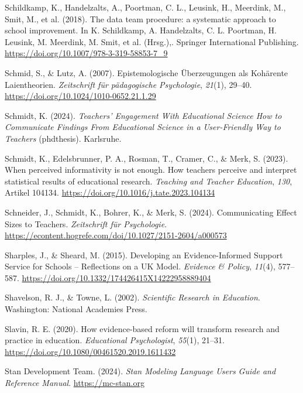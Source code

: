 \documentclass[
  jou,
  floatsintext,
  longtable,
  nolmodern,
  notxfonts,
  notimes,
  colorlinks=true,linkcolor=blue,citecolor=blue,urlcolor=blue]{apa7}
\newlength{\cslhangindent}
\newenvironment{CSLReferences}[2] %
 {\begin{list}{}{%
  \setlength{\itemindent}{0pt}
  \setlength{\leftmargin}{0pt}
  \setlength{\parsep}{0pt}
  \ifodd #1
   \setlength{\leftmargin}{\cslhangindent}
   \setlength{\itemindent}{-1\cslhangindent}
  \fi
  \setlength{\itemsep}{#2\baselineskip}}}
 {\end{list}}
\begin{document}
\begin{CSLReferences}{1}{0}
Schildkamp, K., Handelzalts, A., Poortman, C. L., Leusink, H., Meerdink,
M., Smit, M., et al. (2018). The data team{\texttrademark} procedure: a
systematic approach to school improvement. In K. Schildkamp, A.
Handelzalts, C. L. Poortman, H. Leusink, M. Meerdink, M. Smit, et al.
(Hrsg.),. Springer International Publishing.
\url{https://doi.org/10.1007/978-3-319-58853-7_9}

Schmid, S., \& Lutz, A. (2007). Epistemologische Überzeugungen als
Kohärente Laientheorien. \emph{Zeitschrift für pädagogische
Psychologie}, \emph{21}(1), 29--40.
\url{https://doi.org/10.1024/1010-0652.21.1.29}

Schmidt, K. (2024). \emph{Teachers{'} Engagement With Educational
Science How to Communicate Findings From Educational Science in a
User-Friendly Way to Teachers} (phdthesis). Karlsruhe.

Schmidt, K., Edelsbrunner, P. A., Rosman, T., Cramer, C., \& Merk, S.
(2023). When perceived informativity is not enough. How teachers
perceive and interpret statistical results of educational research.
\emph{Teaching and Teacher Education}, \emph{130}, Artikel 104134.
\url{https://doi.org/10.1016/j.tate.2023.104134}

Schneider, J., Schmidt, K., Bohrer, K., \& Merk, S. (2024).
Communicating Effect Sizes to Teachers. \emph{Zeitschrift für
Psychologie}.
\url{https://econtent.hogrefe.com/doi/10.1027/2151-2604/a000573}

Sharples, J., \& Sheard, M. (2015). Developing an Evidence-Informed
Support Service for Schools -- Reflections on a {UK} Model.
\emph{Evidence \& Policy}, \emph{11}(4), 577--587.
\url{https://doi.org/10.1332/174426415X14222958889404}

Shavelson, R. J., \& Towne, L. (2002). \emph{Scientific Research in
Education}. Washington: National Academies Press.

Slavin, R. E. (2020). How evidence-based reform will transform research
and practice in education. \emph{Educational Psychologist},
\emph{55}(1), 21--31.
\url{https://doi.org/10.1080/00461520.2019.1611432}

Stan Development Team. (2024). \emph{Stan Modeling Language Users Guide
and Reference Manual}. \url{https://mc-stan.org}


\end{CSLReferences}
\end{document}
